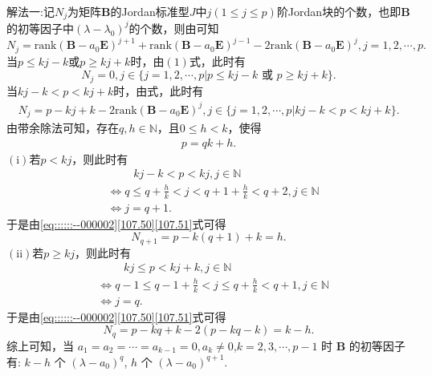 \documentclass[../../main.tex]{subfiles}
\begin{document}
\begin{solution}
{\color{blue}解法一:}记$N_j$为矩阵$\boldsymbol{B}$的Jordan标准型$J$中$j(1 \leqslant j \leqslant p)$阶Jordan块的个数，也即$\boldsymbol{B}$的初等因子中$(\lambda - \lambda_0)^j$的个数，则由可知
$$N_j = \mathrm{rank}(\boldsymbol{B} - a_0\boldsymbol{E})^{j+1} + \mathrm{rank}(\boldsymbol{B} - a_0\boldsymbol{E})^{j-1} - 2\mathrm{rank}(\boldsymbol{B} - a_0\boldsymbol{E})^j, j = 1,2,\cdots,p.$$
\one 当$p \leqslant kj - k$或$p \geqslant kj + k$时，由$(1)$式，此时有
$$N_j = 0, j \in \{j = 1,2,\cdots,p | p \leqslant kj - k \text{ 或 } p \geqslant kj + k\}.$$
\two 当$kj - k < p < kj + k$时，由式，此时有
\begin{align}
N_j = p - kj + k - 2\mathrm{rank}(\boldsymbol{B} - a_0\boldsymbol{E})^j, j \in \{j = 1,2,\cdots,p | kj - k < p < kj + k\}.\label{107.50}
\end{align}
由带余除法可知，存在$q,h \in \mathbb{N}$，且$0 \leqslant h < k$，使得
\begin{align}
p = qk + h.\label{107.51}
\end{align}
$\left( \mathrm{i} \right)$若$p < kj$，则此时有
\begin{align*}
&\quad \quad \,\, kj-k<p<kj,j\in \mathbb{N} 
\\
&\Longleftrightarrow q\leqslant q+\frac{h}{k}<j<q+1+\frac{h}{k}<q+2,j\in \mathbb{N} 
\\
&\Longleftrightarrow j=q+1.
\end{align*}
于是由\eqref{eq::::::--000002}\eqref{107.50}\eqref{107.51}式可得
$$N_{q+1} = p - k(q + 1) + k = h.$$
$\left( \mathrm{ii} \right)$若$p \geqslant kj$，则此时有
\begin{align*}
&\quad \quad \,\, kj\leqslant p<kj+k,j\in \mathbb{N} 
\\
&\Longleftrightarrow q-1\leqslant q-1+\frac{h}{k}<j\leqslant q+\frac{h}{k}<q+1,j\in \mathbb{N} 
\\
&\Longleftrightarrow j=q.
\end{align*}
于是由\eqref{eq::::::--000002}\eqref{107.50}\eqref{107.51}式可得
$$N_q = p - kq + k - 2(p - kq - k) = k - h.$$
综上可知，当 $a_1 = a_2 = \cdots = a_{k-1} = 0, a_k \neq 0$,$k=2,3,\cdots,p-1$ 时 $\boldsymbol{B}$ 的初等因子有: $k - h$ 个 $(\lambda - a_0)^q$, $h$ 个 $(\lambda - a_0)^{q+1}$.


\end{solution}
\end{document}
